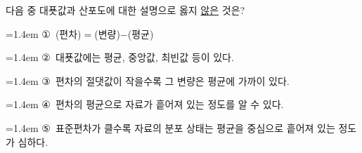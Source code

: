 다음 중 대푯값과 산포도에 대한 설명으로 옳지 \underline{않은} 것은?
\par\medskip\par\noindent\hangindent=1.4em {\small ①}\ (편차)$=$(변량)$-$(평균)\par\noindent\hangindent=1.4em {\small ②}\ 대푯값에는 평균, 중앙값, 최빈값 등이 있다.\par\noindent\hangindent=1.4em {\small ③}\ 편차의 절댓값이 작을수록 그 변량은 평균에 가까이 있다.\par\noindent\hangindent=1.4em {\small ④}\ 편차의 평균으로 자료가 흩어져 있는 정도를 알 수 있다.\par\noindent\hangindent=1.4em {\small ⑤}\ 표준편차가 클수록 자료의 분포 상태는 평균을 중심으로 흩어져 있는 정도가 심하다.\par\medskip
